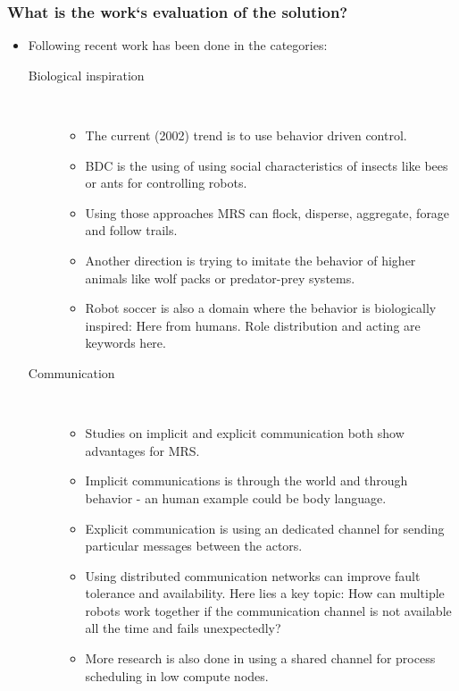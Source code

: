     \subsubsection*{What is the work`s evaluation of the solution?}
    \begin{itemize}
        \item Following recent work has been done in the categories: \
        \begin{description}
            \item[Biological inspiration] \ 
            \begin{itemize} 
                \item The current (2002) trend is to use behavior driven control.
                \item BDC is the using of using social characteristics of insects like bees or ants for controlling robots.
                \item Using those approaches MRS can flock, disperse, aggregate, forage and follow trails.
                \item Another direction is trying to imitate the behavior of higher animals like wolf packs or predator-prey systems.
                \item Robot soccer is also a domain where the behavior is biologically inspired: Here from humans. Role distribution and acting are keywords here.
            \end{itemize}
            \item[Communication] \ 
            \begin{itemize} 
                \item Studies on implicit and explicit communication both show advantages for MRS. 
                \item Implicit communications is through the world and through behavior - an human example could be body language.
                \item Explicit communication is using an dedicated channel for sending particular messages between the actors.
                \item Using distributed communication networks can improve fault tolerance and availability. Here lies a key topic: How can multiple robots work together if the communication channel is not available all the time and fails unexpectedly?
                \item More research is also done in using a shared channel for process scheduling in low compute nodes.
            \end{itemize}

\end{description}
\end{itemize}
